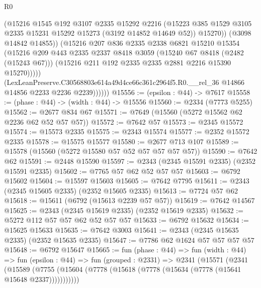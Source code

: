 \begin{lexlean}{R0}
\begin{coremodule}
                      (@15216
                        @1545
                        @192
                        @3107
                        @2335
                        @15292
                        @2216
                        (@15223
                          @385
                          @1529
                          @3105
                          @2335
                          @15231
                          @15292
                          @15273
                          (@3192 @14852 @14649 @52))
                        @15270))
                    (@3098 @14842 @14855))
                  (@15216
                    @207
                    @836
                    @2335
                    @2338
                    @6821
                    @15210
                    @15354
                    (@15216
                      @209
                      @443
                      @2335
                      @2337
                      @8418
                      @3059
                      (@15240 @67 @8418 (@2482 (@15243 @67)))
                      (@15216 @211 @192 @2335 @2335 @2881 @2216 @15390 @15270)))))
              (LexLeanPreserve.C30568803e614a49d4ce66c361c2964f5.R0.__rel_36
                @14866
                @14856
                @2233
                @2236
                @2239))))))
@15556 := (epsilon : @44) -> @7617
@15558 := (phase : @44) -> (width : @44) -> @15556
@15560 := @2334 (@7773 @5255)
@15562 := @2677 @834 @67
@15571 := @7649 (@15560 (@5272 @15562 @62 @2236 @62 @52 @57 @57))
@15572 := @7642 @57
@15573 := @2345 @15572
@15574 := @15573 @2335
@15575 := @2343 @15574
@15577 := @2352 @15572 @2335
@15578 := @15575 @15577
@15580 := @2677 @713 @107
@15589 := @15578 (@15560 (@5272 @15580 @57 @52 @57 @57 @57 @57))
@15590 := @7642 @62
@15591 := @2448 @15590
@15597 := @2343 (@2345 @15591 @2335) (@2352 @15591 @2335)
@15602 := @7765 @57 @62 @52 @57 @57
@15603 := @6792 @15602
@15604 := @15597 @15603
@15605 := @7642 @7795
@15611 := @2343 (@2345 @15605 @2335) (@2352 @15605 @2335)
@15613 := @7724 @57 @62
@15618 := @15611 (@6792 (@15613 @2239 @57 @57))
@15619 := @7642 @14567
@15625 := @2343 (@2345 @15619 @2335) (@2352 @15619 @2335)
@15632 := @5272 @112 @57 @57 @62 @52 @57 @57
@15633 := @6792 @15632
@15634 := @15625 @15633
@15635 := @7642 @3003
@15641 := @2343 (@2345 @15635 @2335) (@2352 @15635 @2335)
@15647 := @7786 @62 @1624 @57 @57 @57 @57
@15648 := @6792 @15647
@15665 := fun (phase : @44) =>
  fun (width : @44) =>
  fun (epsilon : @44) =>
  fun (grouped : @2331) =>
  @2341
    (@15571
      (@2341
        (@15589 (@7755 (@15604 (@7778 (@15618 (@7778 (@15634 (@7778 (@15641 @15648 @2337)))))))))))

\end{coremodule}
\end{lexlean}
